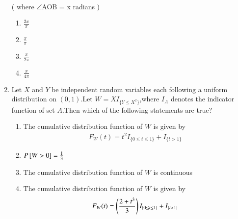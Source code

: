 \begin{enumerate}[label=\thesection.\arabic*.,ref=\thesection.\theenumi]
\\

( where $\angle$AOB = x radians )


    \begin{enumerate}
        \item $\frac{2x}{\pi}$
        \item $\frac{x}{\pi}$
        \item $\frac{x}{2\pi}$
        \item $\frac{x}{4\pi}$
    \end{enumerate}

%
\solution

%
\item Let $X$ and $Y$ be independent random variables each following a uniform distribution on $(0,1)$.Let $W=XI_{\{Y\leq X^2\}}$,where $I_A$ denotes the indicator function of set $A$.Then which of the following statements are true? \\
\begin{enumerate}
\item The cumulative distribution function of $W$ is given by
\begin{align}
  F_W(t)=t^2I_{\{0\leq t \leq 1\}}+ I_{\{t > 1\}}
\end{align}
\item $P{}\left[W>0\right]=\frac{1}{3}$
\item The cumulative distribution function of $W$ is continuous
\item The cumulative distribution function of $W$ is given by
\begin{align}
  F_W(t)=\left(\frac{2+t^3}{3}\right)I_{\{0\leq t \leq 1\}}+ I_{\{t > 1\}}
\end{align}
\end{enumerate}
%
\solution

%
%
\newcommand{\tikzAngleOfLine}{\tikz@AngleOfLine}
  \def\tikz@AngleOfLine(#1)(#2)#3{%
  \pgfmathanglebetweenpoints{%
    \pgfpointanchor{#1}{center}}{%
    \pgfpointanchor{#2}{center}}
  \pgfmathsetmacro{#3}{\pgfmathresult}%
  }


\end{enumerate}
